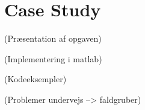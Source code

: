 \documentclass[Main]{subfiles}
\begin{document}
\section*{Case Study}

(Præsentation af opgaven)

(Implementering i matlab)

(Kodeeksempler)

(Problemer undervejs --> faldgruber)
\end{document}

